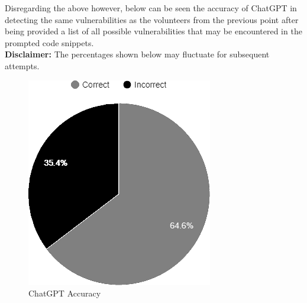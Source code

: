 \noindent Disregarding the above however, below can be seen the accuracy of ChatGPT in detecting the same vulnerabilities as the volunteers from the previous point after being provided a list of all possible vulnerabilities that may be encountered in the prompted code snippets. \\

\noindent\textbf{Disclaimer:} The percentages shown below may fluctuate for subsequent attempts.






\begin{figure}[H]
    \caption{ChatGPT Accuracy}
    \label{chatgptaccuracy}
    \centering
    \includegraphics[scale=0.75]{./Images/chatGPT.png}
\end{figure}

